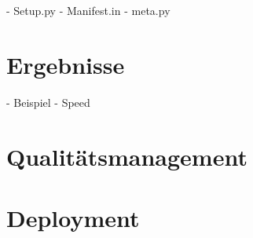 - Setup.py
- Manifest.in
- meta.py



\section{Ergebnisse}

- Beispiel
- Speed



\section{Qualitätsmanagement}
\label{swidgenerator:architektur:qa}



\section{Deployment}
\label{swidgenerator:architektur:deployment}

